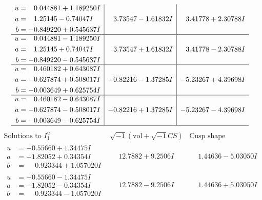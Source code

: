 \documentclass[1p]{elsarticle_modified}
\theoremstyle{definition}
\newcommand{\I}{\sqrt{-1}}
\begin{document}
$$\begin{array}{c|c|c}
\begin{aligned}
u &= \phantom{-}0.044881 + 1.189250 I \\
a &= \phantom{-}1.25145 - 0.74047 I \\
b &= -0.849220 + 0.545637 I\end{aligned}
 & \phantom{-}3.73547 - 1.61832 I & \phantom{-}3.41778 + 2.30788 I \\ \hline\begin{aligned}
u &= \phantom{-}0.044881 - 1.189250 I \\
a &= \phantom{-}1.25145 + 0.74047 I \\
b &= -0.849220 - 0.545637 I\end{aligned}
 & \phantom{-}3.73547 + 1.61832 I & \phantom{-}3.41778 - 2.30788 I \\ \hline\begin{aligned}
u &= \phantom{-}0.460182 + 0.643087 I \\
a &= -0.627874 + 0.508017 I \\
b &= -0.003649 + 0.625754 I\end{aligned}
 & -0.82216 - 1.37285 I & -5.23267 + 4.39698 I \\ \hline\begin{aligned}
u &= \phantom{-}0.460182 - 0.643087 I \\
a &= -0.627874 - 0.508017 I \\
b &= -0.003649 - 0.625754 I\end{aligned}
 & -0.82216 + 1.37285 I & -5.23267 - 4.39698 I\\
 \hline 
 \end{array}$$\newpage$$\begin{array}{c|c|c}  
\text{Solutions to }I^u_{1}& \I (\text{vol} + \sqrt{-1}CS) & \text{Cusp shape}\\
 \hline 
\begin{aligned}
u &= -0.55660 + 1.34475 I \\
a &= -1.82052 + 0.34354 I \\
b &= \phantom{-}0.923344 + 1.057020 I\end{aligned}
 & \phantom{-}12.7882 + 9.2506 I & \phantom{-}1.44636 - 5.03050 I \\ \hline\begin{aligned}
u &= -0.55660 - 1.34475 I \\
a &= -1.82052 - 0.34354 I \\
b &= \phantom{-}0.923344 - 1.057020 I\end{aligned}
 & \phantom{-}12.7882 - 9.2506 I & \phantom{-}1.44636 + 5.03050 I \\ \hline\begin{aligned}

\end{aligned}
\end{array}$$
\end{document}
